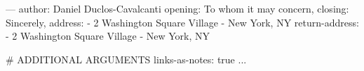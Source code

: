 ---
author: Daniel Duclos-Cavalcanti
opening: To whom it may concern,
closing: Sincerely,
address:
- 2 Washington Square Village
- New York, NY
return-address:
- 2 Washington Square Village
- New York, NY

# ADDITIONAL ARGUMENTS
links-as-notes: true
...
